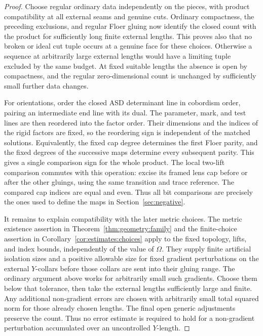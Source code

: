 \begin{proof}
Choose regular ordinary data independently on the pieces, with
product compatibility at all external seams and genuine cuts.
Ordinary compactness, the preceding exclusions, and regular Floer
gluing now identify the closed count with the product for
sufficiently long finite external lengths.  This proves also that
no broken or ideal cut tuple occurs at a genuine face for these
choices.  Otherwise a sequence at arbitrarily large external
lengths would have a limiting tuple excluded by the same budget.
At fixed suitable lengths the absence is open by compactness, and
the regular zero-dimensional count is unchanged by sufficiently
small further data changes.

For orientations, order the closed ASD determinant line in
cobordism order, pairing an intermediate end line with its dual.
The parameter, mark, and test lines are then reordered into the
factor order.  Their dimensions and the indices of the rigid
factors are fixed, so the reordering sign is independent of the
matched solutions.  Equivalently, the fixed cap degree determines
the first Floer parity, and the fixed degrees of the successive
maps determine every subsequent parity.  This gives a single
comparison sign for the whole product.  The local two-lift
comparison commutes with this operation: excise its framed lens
cap before or after the other gluings, using the same transition
and trace reference.  The compared cap indices are equal and even.
Thus all bit comparisons are precisely the ones used to define the
maps in Section~\ref{sec:negative}.

It remains to explain compatibility with the later metric choices.
The metric existence assertion in
Theorem~\ref{thm:geometry:family} and the finite-choice assertion in
Corollary~\ref{cor:estimates:choices} apply to the fixed topology,
lifts, and index bounds, independently of the value of \(\Omega\).
They supply finite artificial isolation sizes and a positive
allowable size for fixed gradient perturbations on the external
\(Y\)-collars before those collars are sent into their gluing
range.  The ordinary argument above works for arbitrarily small
such gradients.  Choose them below that tolerance, then take the
external lengths sufficiently large and finite.  Any additional
non-gradient errors are chosen with arbitrarily small total squared
norm for those already chosen lengths.  The final open generic
adjustments preserve the count.  Thus no error estimate is required
to hold for a non-gradient perturbation accumulated over an
uncontrolled \(Y\)-length.
\end{proof}

